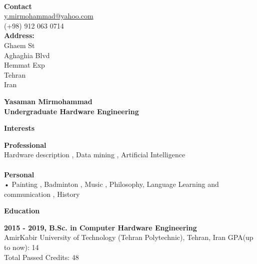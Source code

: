 \documentclass[a4paper,12pt,final]{memoir}
\newcommand{\Sep}{\vspace{1.5em}}
\newcommand{\SmallSep}{\vspace{0.5em}}
\newenvironment{AboutMe}
	{\ignorespaces\textbf{\color{RoyalBlue} About me}}
	{\Sep\ignorespacesafterend}
\newcommand{\CVSection}[1]
	{\Large\textbf{#1}\par
	\SmallSep\normalsize\normalfont}
\newcommand{\CVItem}[1]
	{\textbf{\color{RoyalBlue} #1}}
\begin{document}


\begin{flushright}\small

	
	 \CVItem{\\ Contact} \\
	 
	\url{y.mirmohammad@yahoo.com}  \\
  (+98) 912 063 0714  \\

	\CVItem{Address:} \\
	Ghaem St \\
	Aghaghia Blvd \\
	Hemmat Exp  \\
	Tehran\\
	Iran 
	
\end{flushright}\normalsize
\framebreak


\Huge\bfseries {\color{RoyalBlue} Yasaman Mirmohammad} \\
\Large\bfseries  Undergraduate Hardware Engineering \\

\normalsize\normalfont


\CVSection{Interests}
	\CVItem{Professional}
	\\
 Hardware description , Data mining , Artificial Intelligence \\
	   
	\\
	\CVItem{Personal}
	\\
	•	Painting , Badminton , Music ,  Philosophy, Language Learning and communication , History 
	
\Sep

\CVSection{Education}
\CVItem{2015 - 2019, B.Sc. in Computer Hardware Engineering}\\
AmirKabir University of Technology (Tehran Polytechnic), Tehran, Iran
GPA(up to now): 14 \\
Total Passed Credits: 48
\SmallSep
\end{document}

